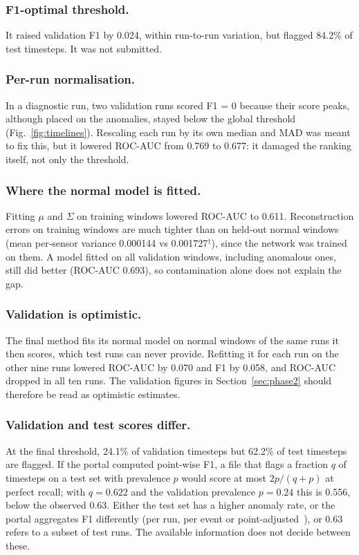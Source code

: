 \documentclass[runningheads]{llncs}
\newcommand{\doc}{$^\dagger$}
\begin{document}
\subsubsection{F1-optimal threshold.} It raised validation F1 by 0.024, within run-to-run variation, but flagged 84.2\% of test timesteps. It was not submitted.

\subsubsection{Per-run normalisation.} In a diagnostic run, two validation runs scored F1 = 0 because their score peaks, although placed on the anomalies, stayed below the global threshold (Fig.~\ref{fig:timelines}). Rescaling each run by its own median and MAD was meant to fix this, but it lowered ROC-AUC from 0.769 to 0.677: it damaged the ranking itself, not only the threshold.

\subsubsection{Where the normal model is fitted.} Fitting $\mu$ and $\Sigma$ on training windows lowered ROC-AUC to 0.611. Reconstruction errors on training windows are much tighter than on held-out normal windows (mean per-sensor variance 0.000144 vs 0.001727\doc), since the network was trained on them. A model fitted on all validation windows, including anomalous ones, still did better (ROC-AUC 0.693), so contamination alone does not explain the gap.

\subsubsection{Validation is optimistic.} The final method fits its normal model on normal windows of the same runs it then scores, which test runs can never provide. Refitting it for each run on the other nine runs lowered ROC-AUC by 0.070 and F1 by 0.058, and ROC-AUC dropped in all ten runs. The validation figures in Section~\ref{sec:phase2} should therefore be read as optimistic estimates.

\subsubsection{Validation and test scores differ.} At the final threshold, 24.1\% of validation timesteps but 62.2\% of test timesteps are flagged. If the portal computed point-wise F1, a file that flags a fraction $q$ of timesteps on a test set with prevalence $p$ would score at most $2p/(q+p)$ at perfect recall; with $q = 0.622$ and the validation prevalence $p = 0.24$ this is 0.556, below the observed 0.63. Either the test set has a higher anomaly rate, or the portal aggregates F1 differently (per run, per event or point-adjusted~\cite{kim2022towards}), or 0.63 refers to a subset of test runs. The available information does not decide between these.
\end{document}
